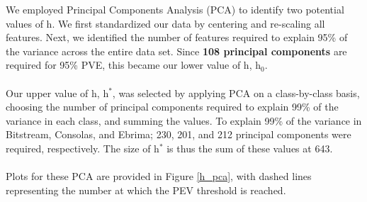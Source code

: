 \documentclass{homework}
\begin{document}
We employed Principal Components Analysis (PCA) to identify two potential values of h. We first standardized our data by centering and re-scaling all features. Next, we identified the number of features required to explain 95\% of the variance across the entire data set. Since \textbf{108 principal components} are required for 95\% PVE, this became our lower value of h, h$_0$. \\\\
Our upper value of h, h$^*$, was selected by applying PCA on a class-by-class basis, choosing the number of principal components required to explain 99\% of the variance in each class, and summing the values. To explain 99\% of the variance in Bitstream, Consolas, and Ebrima; 230, 201, and 212 principal components were required, respectively. The size of h$^*$ is thus the sum of these values at 643.\\\\
Plots for these PCA are provided in Figure \ref{h_pca}, with dashed lines representing the number at which the PEV threshold is reached.
\end{document}
